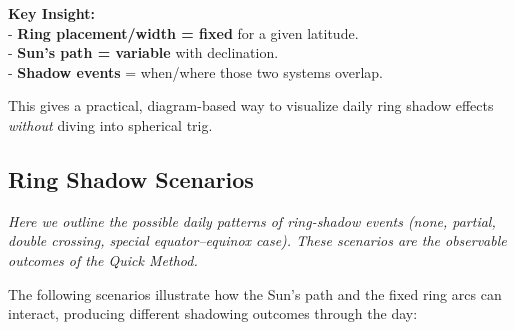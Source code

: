 \documentclass[
  letterpaper,
]{book}
\begin{document}
\textbf{Key Insight:}\\
- \textbf{Ring placement/width = fixed} for a given latitude.\\
- \textbf{Sun's path = variable} with declination.\\
- \textbf{Shadow events} = when/where those two systems overlap.

This gives a practical, diagram-based way to visualize daily ring shadow
effects \emph{without} diving into spherical trig.

\subsection{\texorpdfstring{\textbf{Ring Shadow
Scenarios}}{Ring Shadow Scenarios}}\label{ring-shadow-scenarios}

\emph{Here we outline the possible daily patterns of ring-shadow events
(none, partial, double crossing, special equator--equinox case). These
scenarios are the observable outcomes of the Quick Method.}

The following scenarios illustrate how the Sun's path and the fixed ring
arcs can interact, producing different shadowing outcomes through the
day:
\end{document}
